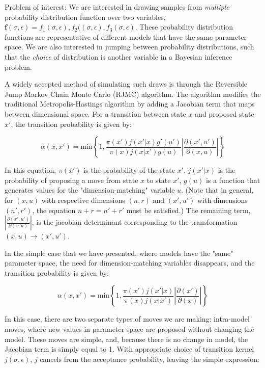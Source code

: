 \documentclass[12pt]{minimal}
\begin{document}
Problem of interest: We are interested in drawing samples from \emph{multiple} probability distribution function over two variables, $ \mathbf{f}(\sigma, \epsilon)= f_1(\sigma, \epsilon), f_2((\sigma, \epsilon),f_3(\sigma, \epsilon) $. These probability distribution functions are representative of different models that have the same parameter space.  We are also interested in jumping between probability distributions, such that the \emph{choice} of distribution is another variable in a Bayesian inference problem. 

 A widely accepted method of simulating such draws is through the Reversible Jump Markov Chain Monte Carlo (RJMC) algorithm.  The algorithm modifies the traditional Metropolis-Hastings algorithm by adding a Jacobian term that maps between dimensional space.  For a transition between state $x$ and proposed state $x'$, the transition probability is given by:

\begin{equation}
\alpha(x,x') = \mathrm{min} \left \{ 1, \frac{\pi(x')j(x'|x)g'(u')}{\pi(x)j(x|x')g(u)} \left | \frac{\partial(x',u')}{\partial(x,u)} \right | \right \}
\end{equation}

In this equation, $\pi(x')$ is the probability of the state $x'$, $j(x'|x)$ is the probability of proposing a move from state $x$ to state $x'$, $g(u)$ is a function that generates values for the "dimension-matching" variable $u$. (Note that in general, for $(x,u)$ with respective dimensions $(n,r)$ and $(x',u')$ with dimensions $(n',r')$, the equation $n+r=n'+r'$ must be satisfied.)  The remaining term, $\left | \frac{\partial(x',u')}{\partial(x,u)} \right |$, is the jacobian determinant corresponding to the transformation $(x,u) \rightarrow (x',u')$.

In the simple case that we have presented, where models have the "same" parameter space, the need for dimension-matching variables disappears, and the transition probability is given by:

\begin{equation}
\alpha(x,x') = \mathrm{min} \left \{ 1, \frac{\pi(x')j(x'|x)}{\pi(x)j(x|x')} \left | \frac{\partial(x')}{\partial(x)} \right | \right \}

\end{equation}

In this case, there are two separate types of moves we are making: intra-model moves, where new values in parameter space are proposed without changing the model.  These moves are simple, and, because there is no change in model, the Jacobian term is simply equal to 1.  With appropriate choice of transition kernel $j(\sigma, \epsilon)$, $j$ cancels from the acceptance probability, leaving the simple expression:
\end{document}
